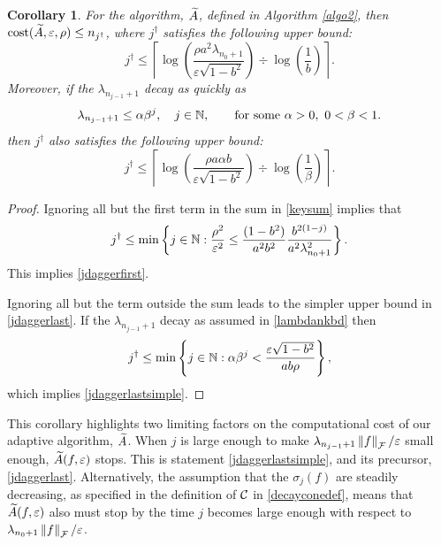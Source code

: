 \documentclass[final]{elsarticle}
\newtheorem{cor}[theorem]{Corollary}
\theoremstyle{definition}
\theoremstyle{remark}
\begin{document}
\begin{cor} For the algorithm, $\tA$, defined in Algorithm \ref{algo2}, then $\cost(\tA,\varepsilon,\rho) \le n_{j^\dagger}$, where $j^\dagger$ satisfies the following upper bound:
\begin{equation} \label{jdaggerfirst}
j^\dagger \le \left \lceil \log\left(\frac{\rho a^2\lambda_{n_{0}+1} }{\varepsilon \sqrt{1 - b^2}}\right) \div \log\left(\frac{1}{b}\right) \right \rceil.
\end{equation}
Moreover, if the $\lambda_{n_{j-1}+1}$ decay as quickly as
\begin{equation}
\label{lambdankbd}
\lambda_{n_{j-1}+1} \le \alpha \beta^j,  \quad j \in \naturals,  \qquad \text{for some } \alpha > 0, \ 0 < \beta < 1.
\end{equation}
then $j^\dagger$ also satisfies the following upper bound:
\begin{equation}
\label{jdaggerlastsimple}
j^\dagger \le
\left \lceil \log\left(\frac{\rho a\alpha b }{\varepsilon \sqrt{1 - b^2}}\right) \div \log\left(\frac{1}{\beta}\right) \right \rceil.
\end{equation}
\end{cor}

\begin{proof}
Ignoring all but the first term in the sum in \eqref{keysum} implies that 
\begin{equation} \label{jsumupperbd}
j^\dagger \le \min \left \{j \in \naturals : \frac{\rho^2}{\varepsilon^2} \le \frac{(1 - b^2)}{a^2b^2} \frac{b^{2(1-j)}}{a^2\lambda_{n_{0}+1}^2}    \right\}.
\end{equation}
This implies \eqref{jdaggerfirst}.

Ignoring all but the term outside the sum leads to the simpler upper bound in \eqref{jdaggerlast}.  If the $\lambda_{n_{j-1}+1}$ decay as assumed in \eqref{lambdankbd} then
\[
j^\dagger \le \min \left \{j \in \naturals :  \alpha \beta^j < \frac{\varepsilon\sqrt{1 - b^2}}{ab \rho} \right\},
\]
which implies \eqref{jdaggerlastsimple}.
\end{proof}

This corollary highlights two limiting factors on the computational cost of our adaptive algorithm, $\tA$. When $j$ is large enough to make $\lambda_{n_{j-1}+1}\norm[\cf]{f}/\varepsilon$ small enough, $\tA(f,\varepsilon)$ stops.  This is statement \eqref{jdaggerlastsimple}, and its precursor, \eqref{jdaggerlast}.  Alternatively, the assumption that the $\sigma_j(f)$ are steadily decreasing, as specified in the definition of $\cc$ in \eqref{decayconedef}, means that $\tA(f,\varepsilon)$ also must stop by the time $j$ becomes large enough with respect to $\lambda_{n_0+1}\norm[\cf]{f}/\varepsilon$.
\end{document}
